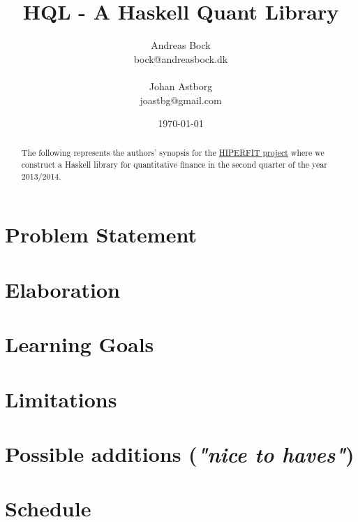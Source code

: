 \documentclass[11pt]{article}
\makeatletter
\def\Author{Andreas Bock\\
bock@andreasbock.dk\\\\
Johan Astborg\\
joastbg@gmail.com}
\def\Title{\bf HQL - A Haskell Quant Library}
\makeatother
\begin{document}
\title{\Title}
\author{\Author}
\date{\today}
\maketitle

\begin{abstract}
The following represents the authors' synopsis for the
\href{http://hiperfit.dk/studentproject_haskell_library_finance.html}{HIPERFIT project}
where we construct a Haskell library for quantitative finance in the second quarter
of the year 2013/2014.
\end{abstract}

\section*{Problem Statement}
\section*{Elaboration}
\section*{Learning Goals}
\section*{Limitations}
\section*{Possible additions (\emph{"nice to haves"})}
\section*{Schedule}
\end{document}
